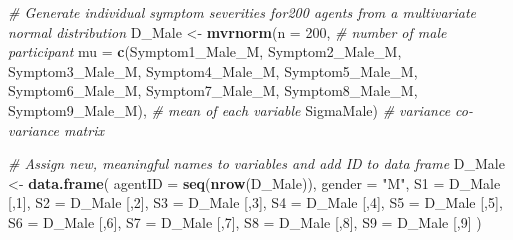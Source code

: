 \documentclass[]{article}
\newenvironment{Shaded}{\begin{snugshade}}{\end{snugshade}}
\newcommand{\KeywordTok}[1]{\textcolor[rgb]{0.13,0.29,0.53}{\textbf{#1}}}
\newcommand{\DataTypeTok}[1]{\textcolor[rgb]{0.13,0.29,0.53}{#1}}
\newcommand{\DecValTok}[1]{\textcolor[rgb]{0.00,0.00,0.81}{#1}}
\newcommand{\StringTok}[1]{\textcolor[rgb]{0.31,0.60,0.02}{#1}}
\newcommand{\CommentTok}[1]{\textcolor[rgb]{0.56,0.35,0.01}{\textit{#1}}}
\newcommand{\NormalTok}[1]{#1}
\begin{document}
\begin{Shaded}
\begin{Highlighting}[]
\CommentTok{# Generate individual symptom severities for200 agents from a multivariate normal distribution}
\NormalTok{D_Male <-}\StringTok{ }\KeywordTok{mvrnorm}\NormalTok{(}\DataTypeTok{n =} \DecValTok{200}\NormalTok{, }\CommentTok{# number of male participant}
                  \DataTypeTok{mu =} \KeywordTok{c}\NormalTok{(Symptom1_Male_M, Symptom2_Male_M, Symptom3_Male_M, Symptom4_Male_M, Symptom5_Male_M, Symptom6_Male_M, Symptom7_Male_M, Symptom8_Male_M, Symptom9_Male_M), }\CommentTok{# mean of each variable}
\NormalTok{                  SigmaMale) }\CommentTok{# variance co-variance matrix}

\CommentTok{# Assign new, meaningful names to variables and add ID to data frame}
\NormalTok{D_Male <-}\StringTok{ }\KeywordTok{data.frame}\NormalTok{(}
  \DataTypeTok{agentID =} \KeywordTok{seq}\NormalTok{(}\KeywordTok{nrow}\NormalTok{(D_Male)),}
  \DataTypeTok{gender =} \StringTok{"M"}\NormalTok{,}
  \DataTypeTok{S1 =}\NormalTok{ D_Male [,}\DecValTok{1}\NormalTok{],}
  \DataTypeTok{S2 =}\NormalTok{  D_Male [,}\DecValTok{2}\NormalTok{],}
  \DataTypeTok{S3 =}\NormalTok{  D_Male [,}\DecValTok{3}\NormalTok{],}
  \DataTypeTok{S4 =}\NormalTok{ D_Male [,}\DecValTok{4}\NormalTok{],}
  \DataTypeTok{S5 =}\NormalTok{ D_Male [,}\DecValTok{5}\NormalTok{],}
  \DataTypeTok{S6 =}\NormalTok{  D_Male [,}\DecValTok{6}\NormalTok{],}
  \DataTypeTok{S7 =}\NormalTok{  D_Male [,}\DecValTok{7}\NormalTok{],}
  \DataTypeTok{S8 =}\NormalTok{ D_Male [,}\DecValTok{8}\NormalTok{],}
  \DataTypeTok{S9 =}\NormalTok{ D_Male [,}\DecValTok{9}\NormalTok{]}
\NormalTok{)}


\end{Highlighting}
\end{Shaded}
\end{document}
